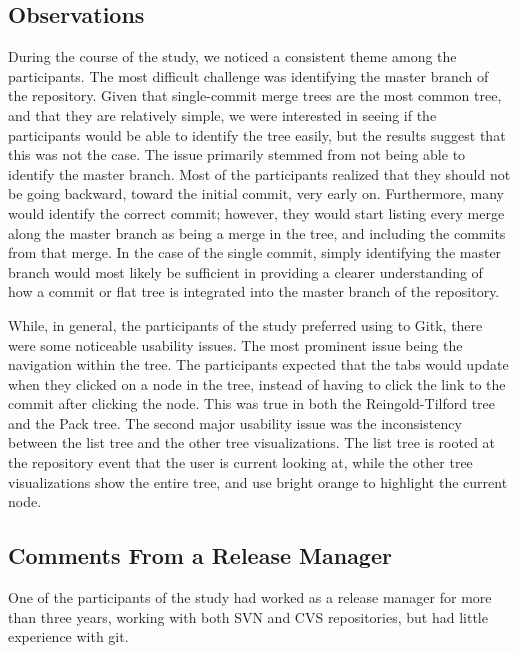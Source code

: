 \documentclass[draft]{IEEEtran}
\begin{document}
\subsection{Observations}
\label{sub:observations}


During the course of the study, we noticed a consistent theme among the
participants. The most difficult challenge was identifying the master
branch of the repository. Given that single-commit merge trees are the
most common tree, and that they are relatively simple, we were
interested in seeing if the participants would be able to identify the
tree easily, but the results suggest that this was not the case. The
issue primarily stemmed from not being able to identify the master
branch. Most of the participants realized that they should not be going
backward, toward the initial commit, very early on. Furthermore, many
would identify the correct commit; however, they would start listing
every merge along the master branch as being a merge in the tree, and
including the commits from that merge. In the case of the single commit,
simply identifying the master branch would most likely be sufficient in
providing a clearer understanding of how a commit or flat tree is
integrated into the master branch of the repository.

While, in general, the participants of the study preferred using \tool
to Gitk, there were some noticeable usability issues. The most prominent
issue being the navigation within the tree. The participants expected
that the tabs would update when they clicked on a node in the tree,
instead of having to click the link to the commit after clicking the
node. This was true in both the Reingold-Tilford tree and the Pack tree.
The second major usability issue was the inconsistency between the list
tree and the other tree visualizations. The list tree is rooted at the
repository event that the user is current looking at, while the other
tree visualizations show the entire tree, and use bright orange to
highlight the current node.


\subsection{Comments From a Release Manager}
\label{sub:comments_from_a_release_manager}

One of the participants of the study had worked as a release manager for
more than three years, working with both SVN and CVS repositories, but
had little experience with git.
\end{document}
